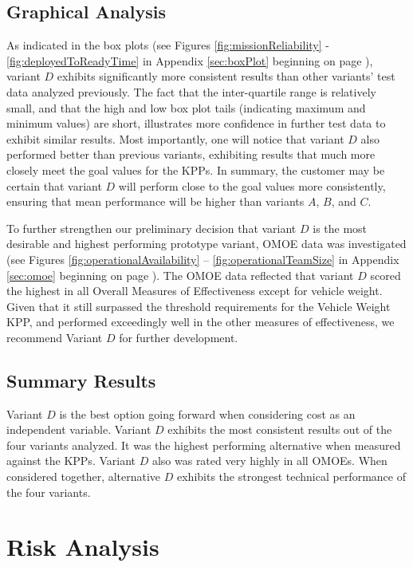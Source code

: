 \documentclass[letterpaper,10pt]{article}
\begin{document}
\subsection{Graphical Analysis}
As indicated in the box plots (see Figures \ref{fig:missionReliability} - \ref{fig:deployedToReadyTime} in Appendix \ref{sec:boxPlot} beginning on page \pageref{fig:missionReliability}), variant $D$ exhibits significantly more consistent results than other variants' test data analyzed previously. The fact that the inter-quartile range is relatively small, and that the high and low box plot tails (indicating maximum and minimum values) are short, illustrates more confidence in further test data to exhibit similar results. Most importantly, one will notice that variant $D$ also performed better than previous variants, exhibiting results that much more closely meet the goal values for the KPPs. In summary, the customer may be certain that variant $D$ will perform close to the goal values more consistently, ensuring that mean performance will be higher than variants $A$, $B$, and $C$.

To further strengthen our preliminary decision that variant $D$ is the most desirable and highest performing prototype variant, OMOE data was investigated (see Figures \ref{fig:operationalAvailability} -- \ref{fig:operationalTeamSize} in Appendix \ref{sec:omoe} beginning on page \pageref{fig:operationalAvailability}). The OMOE data reflected that variant $D$ scored the highest in all Overall Measures of Effectiveness except for vehicle weight. Given that it still surpassed the threshold requirements for the Vehicle Weight KPP, and performed exceedingly well in the other measures of effectiveness, we recommend Variant $D$ for further development.

\subsection{Summary Results}
Variant $D$ is the best option going forward when considering cost as an independent variable. Variant $D$ exhibits the most consistent results out of the four variants analyzed. It was the highest performing alternative when measured against the KPPs. Variant $D$ also was rated very highly in all OMOEs. When considered together, alternative $D$ exhibits the strongest technical performance of the four variants.

\section{Risk Analysis}
\end{document}
